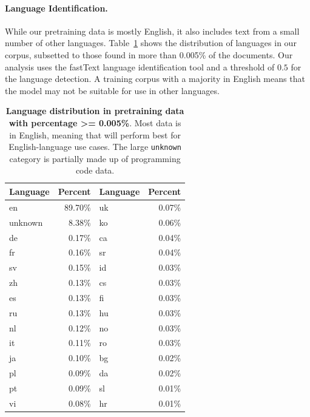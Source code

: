 \paragraph{Language Identification.}
While our pretraining data is mostly English, it also includes text from a small number of other languages. Table~\ref{tab:lid} shows the distribution of languages in our corpus, subsetted to those found in more than 0.005\% of the documents. Our analysis uses the fastText \citep{bojanowski2016fasttext} language identification tool and a threshold  of $0.5$ for the language detection. A training corpus with a majority in English means that the model may not be suitable for use in other languages.
\begin{table}[htbp]
\centering
\begin{tabular}{lr|lr}
\toprule
Language & \multicolumn{1}{l}{Percent} & Language & \multicolumn{1}{l}{Percent} \\
\midrule
en       & 89.70\%                     & uk       & 0.07\%                      \\
unknown  & 8.38\%                      & ko       & 0.06\%                      \\
de       & 0.17\%                      & ca       & 0.04\%                      \\
fr       & 0.16\%                      & sr       & 0.04\%                      \\
sv       & 0.15\%                      & id       & 0.03\%                      \\
zh       & 0.13\%                      & cs       & 0.03\%                      \\
es       & 0.13\%                      & fi       & 0.03\%                      \\
ru       & 0.13\%                      & hu       & 0.03\%                      \\
nl       & 0.12\%                      & no       & 0.03\%                      \\
it       & 0.11\%                      & ro       & 0.03\%                      \\
ja       & 0.10\%                      & bg       & 0.02\%                      \\
pl       & 0.09\%                      & da       & 0.02\%                      \\
pt       & 0.09\%                      & sl       & 0.01\%                      \\
vi       & 0.08\%                      & hr       & 0.01\%   \\
\bottomrule
\end{tabular}
\caption{\textbf{Language distribution in pretraining data with percentage \textgreater{}= 0.005\%}. Most data is in English, meaning that \cinnamon{} will perform best for English-language use cases. The large \texttt{unknown} category is partially made up of programming code data.
}
\label{tab:lid}
\end{table}

